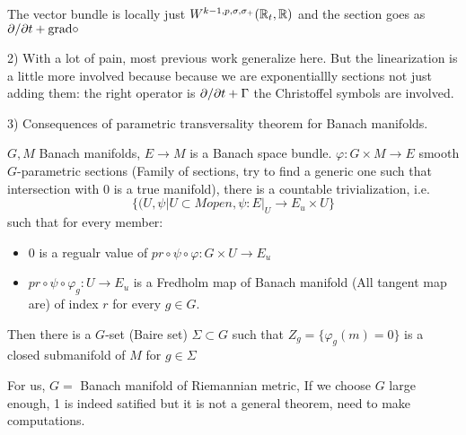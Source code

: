 \documentclass{amsart}
\begin{document}
The vector bundle is locally just $W^{k-1,p,\sigma,\sigma_+}(\mathbb{R}_t,\mathbb{R})$ and the section goes as $\partial/\partial t+\mathrm{grad}\circ$

2) With a lot of pain, most previous work generalize here. But the linearization is a little more involved because because we are exponentiallly sections not just adding them: the right operator is $\partial/\partial t+\Gamma$ the Christoffel symbols are involved.

3) Consequences of parametric transversality theorem for Banach manifolds.

\begin{prop}
$G,M$ Banach manifolds, $E\to M$ is a Banach space bundle. $\varphi:G\times M\to E$ smooth $G$-parametric sections (Family of sections, try to find a generic one such that intersection with $0$ is a true manifold), there is a countable trivialization, i.e.
\[
\{(U,\psi|U\subset M open, \psi:E|_{U}\to E_u\times U\}
\]
such that for every member:
\begin{itemize}
\item $0$ is a regualr value of $pr\circ\psi\circ\varphi:G\times U\to E_u$
\item $pr\circ\psi\circ\varphi_g:U\to E_u$ is a Fredholm map of Banach manifold (All tangent map are) of index $r$ for every $g\in G$.

\end{itemize}

Then there is a $G$-set (Baire set) $\Sigma\subset G$ such that $Z_g=\{\varphi_g(m)=0\}$ is a closed submanifold of $M$ for $g\in\Sigma$ 

For us, $G=$ Banach manifold of Riemannian metric, If we choose $G$ large enough, 1 is indeed satified but it is not a general theorem, need to make computations.





\end{prop} 
\end{document}
